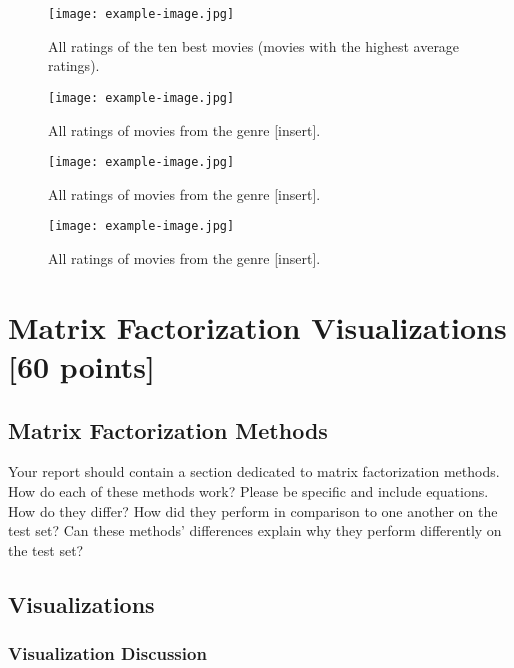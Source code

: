 \begin{figure}[!h]
    \centering
    \texttt{[image: example-image.jpg]}
    \caption{All ratings of the ten best movies (movies with the highest average ratings).}
    \label{fig:basic-vis-3}
\end{figure}

\begin{figure}[!h]
    \centering
    \texttt{[image: example-image.jpg]}
    \caption{All ratings of movies from the genre [insert].}
    \label{fig:basic-vis-4a}
\end{figure}

\begin{figure}[!h]
    \centering
    \texttt{[image: example-image.jpg]}
    \caption{All ratings of movies from the genre [insert].}
    \label{fig:basic-vis-4b}
\end{figure}

\begin{figure}[!h]
    \centering
    \texttt{[image: example-image.jpg]}
    \caption{All ratings of movies from the genre [insert].}
    \label{fig:basic-vis-4c}
\end{figure}

\newpage

\section{Matrix Factorization Visualizations [60 points]}

\subsection{Matrix Factorization Methods}

Your report should contain a section dedicated to matrix factorization methods. How do each of these methods work? Please be specific and include equations. How do they differ? How did they perform in comparison to one another on the test set? Can these methods’ differences explain why they perform differently on the test set?

\subsection{Visualizations}

\subsubsection{Visualization Discussion}


